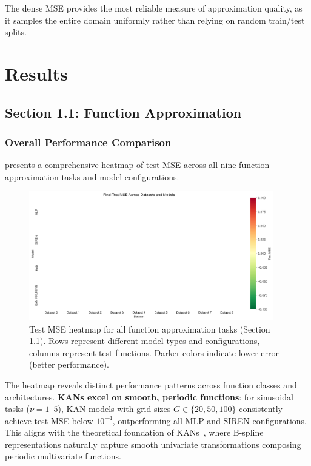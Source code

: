 \documentclass[11pt,a4paper]{article}
\begin{document}
The dense MSE provides the most reliable measure of approximation quality, as it samples the entire domain uniformly rather than relying on random train/test splits.

\section{Results}
\label{sec:results}

\subsection{Section 1.1: Function Approximation}

\subsubsection{Overall Performance Comparison}

 presents a comprehensive heatmap of test MSE across all nine function approximation tasks and model configurations.

\begin{figure}[htbp]
\centering
\includegraphics[width=0.95\textwidth]{../section1/analysis/section1_complete_analysis_20251021_143055/section1_1_analysis/01_comparative_metrics/all_datasets_heatmap_test.png}
\caption{Test MSE heatmap for all function approximation tasks (Section 1.1). Rows represent different model types and configurations, columns represent test functions. Darker colors indicate lower error (better performance).}
\label{fig:s11_heatmap}
\end{figure}

The heatmap reveals distinct performance patterns across function classes and architectures. \textbf{KANs excel on smooth, periodic functions}: for sinusoidal tasks ($\nu = 1$--$5$), KAN models with grid sizes $G \in \{20, 50, 100\}$ consistently achieve test MSE below $10^{-4}$, outperforming all MLP and SIREN configurations. This aligns with the theoretical foundation of KANs~\citep{liu2024kan}, where B-spline representations naturally capture smooth univariate transformations composing periodic multivariate functions.
\end{document}

